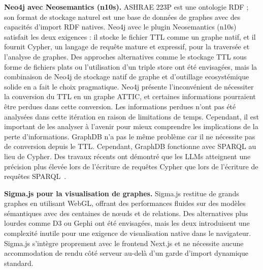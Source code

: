 \textbf{Neo4j avec Neosemantics (n10s).}
ASHRAE 223P est une ontologie RDF ; son format de stockage naturel est une base de données de graphes avec
des capacités d'import RDF natives. Neo4j avec le plugin Neosemantics (n10s) satisfait les deux
exigences : il stocke le fichier TTL comme un graphe natif, et il fournit Cypher, un
langage de requête mature et expressif, pour la traversée et l'analyse de graphes. Des approches
alternatives comme le stockage TTL sous forme de fichiers plats ou l'utilisation d'un triple store ont
été envisagées, mais la combinaison de Neo4j de stockage natif de graphe et d'outillage ecosystémique
solide en a fait le choix pragmatique. Neo4j présente l'inconvénient de nécessiter la conversion du TTL
en un graphe ATTIC, et certaines informations pourraient être perdues dans cette conversion.
Les informations perdues n'ont pas été analysées dans cette itération en raison de limitations de temps.
Cependant, il est important de les analyser à l'avenir pour mieux comprendre les implications de la
perte d'informations.
GraphDB n'a pas le même problème car il ne nécessite pas de conversion depuis le TTL.
Cependant, GraphDB fonctionne avec SPARQL au lieu de Cypher.
Des travaux récents ont démontré que les LLMs atteignent une précision plus élevée lors de l'écriture de
requêtes Cypher que lors de l'écriture de requêtes SPARQL~\cite{Sivasubramaniam2024}.

\textbf{Sigma.js pour la visualisation de graphes.}
Sigma.js restitue de grands graphes en utilisant WebGL, offrant des performances fluides sur des modèles
sémantiques avec des centaines de nœuds et de relations. Des alternatives plus lourdes comme D3 ou Gephi
ont été envisagées, mais les deux introduisent une complexité inutile pour une exigence de visualisation
native dans le navigateur. Sigma.js s'intègre proprement avec le frontend Next.js et ne nécessite aucune
accommodation de rendu côté serveur au-delà d'un garde d'import dynamique standard.
